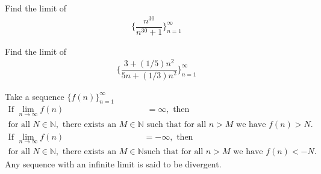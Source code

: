 \begin{exercise}
Find the limit of 
\begin{align*}
    \Big\{\dfrac{n^{30}}{n^{30}+1}\Big\}_{n=1}^{\infty}
\end{align*}
\end{exercise}

\begin{exercise}
Find the limit of 
\begin{align*}
    \Big\{\dfrac{3+(1/5)n^{2}}{5n+(1/3)n^{2}}\Big\}_{n=1}^{\infty}
\end{align*}
\end{exercise}

\begin{definition}
Take a sequence $\{f(n)\}_{n=1}^{\infty}$ 
\begin{align*}
    \text{If} \hspace{4pt} \lim_{n \longrightarrow \infty} f(n) &= \infty, \hspace{4pt} \text{then}\\[2ex]
    \text{for all} \hspace{4pt} N \in \mathbb{N}, \hspace{4pt} \text{there exists an} \hspace{4pt} M \in \mathbb{N} \hspace{4pt} &\text{such that for all} \hspace{4pt} n > M \hspace{4pt} \text{we have} \hspace{4pt} f(n) > N.
\end{align*}
\begin{align*}
    \text{If} \hspace{4pt} \lim_{n \longrightarrow \infty} f(n) &= -\infty, \hspace{4pt} \text{then}\\[2ex]
    \text{for all} \hspace{4pt} N \in \mathbb{N}, \hspace{4pt} \text{there exists an} \hspace{4pt} M \in \mathbb{N} \hspace{4pt} &\text{such that for all} \hspace{4pt} n > M \hspace{4pt} \text{we have} \hspace{4pt} f(n) < -N.
\end{align*}
Any sequence with an infinite limit is said to be divergent.
\label{definition_infinite_limit_sequence}
\end{definition}

